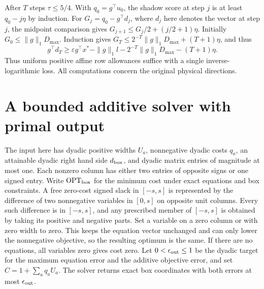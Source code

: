 \documentclass[11pt]{article}
\begin{document}
After \(T\) steps \(\tau\le5/4\). With \(q_0=g^\top u_0\), the shadow score at step \(j\) is at least \(q_0-j\eta\) by induction. For \(G_j=q_0-g^\top d_j\), where \(d_j\) here denotes the vector at step \(j\), the midpoint comparison gives \(G_{j+1}\le G_j/2+(j/2+1)\eta\). Initially \(G_0\le\|g\|_1D_{\max}\). Induction gives \(G_T\le2^{-T}\|g\|_1D_{\max}+(T+1)\eta\), and thus
\[
 g^\top d_T\ge \varepsilon g^\top x^*-\|g\|_1 l
       -2^{-T}\|g\|_1D_{\max}-(T+1)\eta.                             \tag{3}
\]
Thus uniform positive affine row allowances suffice with a single inverse-logarithmic loss. All computations concern the original physical directions.

\hypertarget{a-bounded-additive-solver-with-primal-output}{%
\section*{A bounded additive solver with primal output}\label{a-bounded-additive-solver-with-primal-output}}

The input here has dyadic positive widths \(U_a\), nonnegative dyadic costs \(q_a\), an attainable dyadic right hand side \(d_{\rm box}\), and dyadic matrix entries of magnitude at most one. Each nonzero column has either two entries of opposite signs or one signed entry. Write \(\mathrm{OPT}_{\rm box}\) for the minimum cost under exact equations and box constraints. A free zero-cost signed slack in \([-s,s]\) is represented by the difference of two nonnegative variables in \([0,s]\) on opposite unit columns. Every such difference is in \([-s,s]\), and any prescribed member of \([-s,s]\) is obtained by taking its positive and negative parts. Set a variable on a zero column or with zero width to zero. This keeps the equation vector unchanged and can only lower the nonnegative objective, so the resulting optimum is the same. If there are no equations, all variables zero gives cost zero. Let \(0<\epsilon_{\rm out}\le1\) be the dyadic target for the maximum equation error and the additive objective error, and set \(C=1+\sum_a q_a U_a\). The solver returns exact box coordinates with both errors at most \(\epsilon_{\rm out}\).
\end{document}
